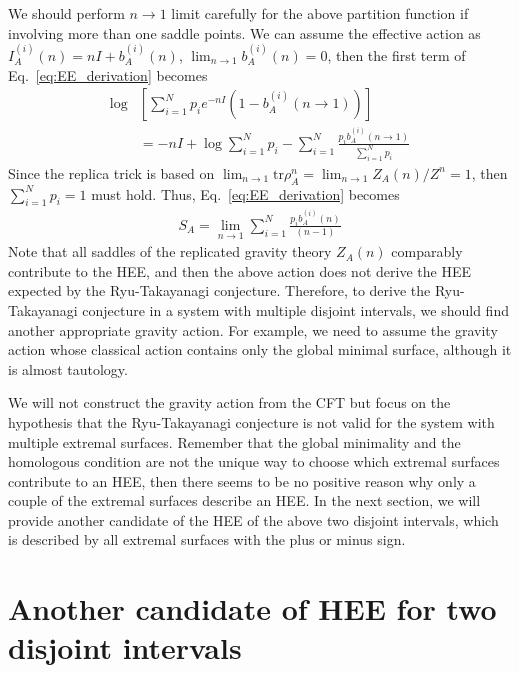 \documentclass[%
 reprint,
 amsmath,amssymb,
 aps,
]{revtex4-2}
\begin{document}
    We should perform $n \to 1$ limit carefully for the above partition function if involving more than one saddle points. We can assume the effective action as $I_A^{(i)}(n) = n I + b^{(i)}_A(n)$, $\lim_{n \to 1}b^{(i)}_A(n) = 0$, then the first term of Eq.~\eqref{eq:EE_derivation} becomes 
\begin{align}\label{eq:effective action}
    \log &\left[ \sum_{i=1}^N p_i e^{-nI}\left( 1-b^{(i)}_A(n \to 1) \right) \right] \nonumber\\
    &= -nI + \log \sum_{i=1}^N p_i - \sum_{i=1}^N \frac{p_i b^{(i)}_A(n \to 1)}{ \sum_{i=1}^N p_i }
\end{align}
    Since the replica trick is based on $\lim_{n \to 1}\mathrm{tr} \rho^n_A = \lim_{n \to 1} Z_A(n)/Z^n = 1$, then $\sum_{i=1}^N p_i=1$ must hold. Thus, Eq.~\eqref{eq:EE_derivation} becomes
\begin{gather}
    S_A = \lim_{n \to 1} \sum_{i=1}^N \frac{p_i b^{(i)}_A(n)}{(n-1)}
\end{gather}
    Note that all saddles of the replicated gravity theory $Z_A(n)$ comparably contribute to the HEE, and then the above action does not derive the HEE expected by the Ryu-Takayanagi conjecture. Therefore, to derive the Ryu-Takayanagi conjecture in a system with multiple disjoint intervals, we should find another appropriate gravity action. For example, we need to assume the gravity action whose classical action contains only the global minimal surface, although it is almost tautology. 


    We will not construct the gravity action from the CFT but focus on the hypothesis that the Ryu-Takayanagi conjecture is not valid for the system with multiple extremal surfaces. Remember that the global minimality and the homologous condition are not the unique way to choose which extremal surfaces contribute to an HEE, then there seems to be no positive reason why only a couple of the extremal surfaces describe an HEE. In the next section, we will provide another candidate of the HEE of the above two disjoint intervals, which is described by all extremal surfaces with the plus or minus sign.


\section{\label{sec:3} Another candidate of HEE for two disjoint intervals}
\end{document}
